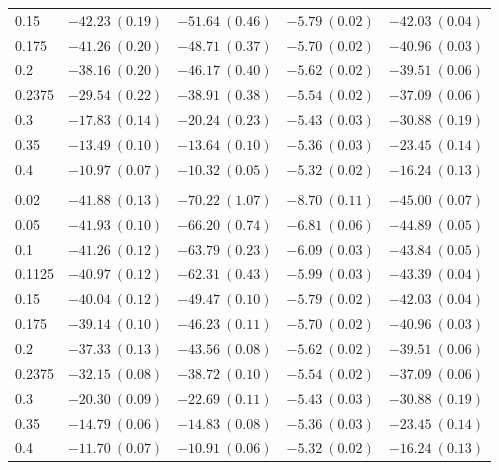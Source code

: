 \begin{table}[htbp]
\begin{tabular}{@{} l rrrr @{}}
0.15 & $-42.23\ (0.19)$ & $-51.64\ (0.46)$ & $-5.79\ (0.02)$ & $-42.03\ (0.04)$ \\
0.175 & $-41.26\ (0.20)$ & $-48.71\ (0.37)$ & $-5.70\ (0.02)$ & $-40.96\ (0.03)$ \\
0.2 & $-38.16\ (0.20)$ & $-46.17\ (0.40)$ & $-5.62\ (0.02)$ & $-39.51\ (0.06)$ \\
0.2375 & $-29.54\ (0.22)$ & $-38.91\ (0.38)$ & $-5.54\ (0.02)$ & $-37.09\ (0.06)$ \\
0.3 & $-17.83\ (0.14)$ & $-20.24\ (0.23)$ & $-5.43\ (0.03)$ & $-30.88\ (0.19)$ \\
0.35 & $-13.49\ (0.10)$ & $-13.64\ (0.10)$ & $-5.36\ (0.03)$ & $-23.45\ (0.14)$ \\
0.4 & $-10.97\ (0.07)$ & $-10.32\ (0.05)$ & $-5.32\ (0.02)$ & $-16.24\ (0.13)$ \\
\addlinespace
\multicolumn{5}{@{}l}{\textit{Wide ($p \sim \mathcal{U}(0.05, 0.3)$)}} \\
0.02 & $-41.88\ (0.13)$ & $-70.22\ (1.07)$ & $-8.70\ (0.11)$ & $-45.00\ (0.07)$ \\
0.05 & $-41.93\ (0.10)$ & $-66.20\ (0.74)$ & $-6.81\ (0.06)$ & $-44.89\ (0.05)$ \\
0.1 & $-41.26\ (0.12)$ & $-63.79\ (0.23)$ & $-6.09\ (0.03)$ & $-43.84\ (0.05)$ \\
0.1125 & $-40.97\ (0.12)$ & $-62.31\ (0.43)$ & $-5.99\ (0.03)$ & $-43.39\ (0.04)$ \\
0.15 & $-40.04\ (0.12)$ & $-49.47\ (0.10)$ & $-5.79\ (0.02)$ & $-42.03\ (0.04)$ \\
0.175 & $-39.14\ (0.10)$ & $-46.23\ (0.11)$ & $-5.70\ (0.02)$ & $-40.96\ (0.03)$ \\
0.2 & $-37.33\ (0.13)$ & $-43.56\ (0.08)$ & $-5.62\ (0.02)$ & $-39.51\ (0.06)$ \\
0.2375 & $-32.15\ (0.08)$ & $-38.72\ (0.10)$ & $-5.54\ (0.02)$ & $-37.09\ (0.06)$ \\
0.3 & $-20.30\ (0.09)$ & $-22.69\ (0.11)$ & $-5.43\ (0.03)$ & $-30.88\ (0.19)$ \\
0.35 & $-14.79\ (0.06)$ & $-14.83\ (0.08)$ & $-5.36\ (0.03)$ & $-23.45\ (0.14)$ \\
0.4 & $-11.70\ (0.07)$ & $-10.91\ (0.06)$ & $-5.32\ (0.02)$ & $-16.24\ (0.13)$ \\
\bottomrule
\end{tabular}
\vspace{2pt}
\begin{minipage}{\linewidth}\footnotesize

\end{minipage}
\end{table}
